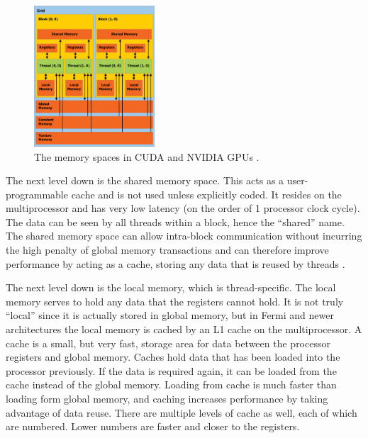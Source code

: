 \begin{figure}[h!] 
  \centering
    \includegraphics[width=0.4\textwidth]{graphics/CUDA_memory.eps}
     \caption[The memory spaces in CUDA and NVIDIA GPUs.]{The memory spaces in CUDA and NVIDIA GPUs \cite{cuda}. \label{cuda_mem}}
\end{figure} 

The next level down is the shared memory space.  This acts as a user-programmable cache and is not used unless explicitly coded.  It resides on the multiprocessor and has very low latency (on the order of 1 processor clock cycle). The data can be seen by all threads within a block, hence the ``shared'' name.  The shared memory space can allow intra-block communication  without incurring the high penalty of global memory transactions and can therefore improve performance by acting as a cache, storing any data that is reused by threads \cite{cuda}.  

The next level down is the local memory, which is thread-specific.  The local memory serves to hold any data that the registers cannot hold.  It is not truly ``local'' since it is actually stored in global memory, but in Fermi and newer architectures the local memory is cached by an L1 cache on the multiprocessor.  A cache is a small, but very fast, storage area for data between the processor registers and global memory.  Caches hold data that has been loaded into the processor previously.  If the data is required again, it can be loaded from the cache instead of the global memory.  Loading from cache is much faster than loading form global memory, and caching increases performance by taking advantage of data reuse.  There are multiple levels of cache as well, each of which are numbered.  Lower numbers are faster and closer to the registers.    


